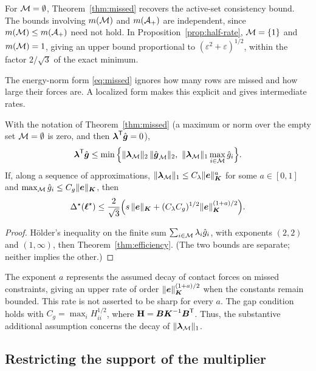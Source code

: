 For $\mathcal{M}=\emptyset$, Theorem~\ref{thm:missed} recovers the active-set consistency bound. The bounds involving $m(\mathcal{M})$ and
$m(\mathcal{A}_{+})$ are independent, since $m(\mathcal{M})\le m(\mathcal{A}_{+})$ need not hold. In Proposition~\ref{prop:half-rate},
$\mathcal{M}=\{1\}$ and $m(\mathcal{M})=1$, giving an upper bound proportional to $(\varepsilon^2+\varepsilon)^{1/2}$, within the factor
$2/\sqrt3$ of the exact minimum.

The energy-norm form \eqref{eq:missed} ignores how many rows are missed and how large their forces are. A localized
form makes this explicit and gives intermediate rates.

\begin{corollary}\label{cor:localized}
With the notation of Theorem~\ref{thm:missed} (a maximum or norm over the empty set $\mathcal{M}=\emptyset$ is zero, and then $\boldsymbol{\lambda}^{\mathsf{T}}\hat{\boldsymbol{g}}=0$),
\begin{equation}\label{eq:localized}
  \vlam\T\gh\le\min\Big\{\norm{\vlam_{\Miss}}_2\,\norm{\gh_{\Miss}}_2,\ \norm{\vlam_{\Miss}}_1\max_{i\in\Miss}\hat g_i\Big\}.
\end{equation}
If, along a sequence of approximations, $\lVert \boldsymbol{\lambda}_{\mathcal{M}} \rVert_1\le C_\lambda\lVert \boldsymbol{e} \rVert_{\boldsymbol{K}}^{a}$ for some $a\in[0,1]$ and
$\max_{\mathcal{M}}\hat g_i\le C_g\lVert \boldsymbol{e} \rVert_{\boldsymbol{K}}$, then
\begin{equation}\label{eq:intermediate-rate}
  \Delta^{\star}(\boldsymbol{\ell}^{\star})\le\frac{2}{\sqrt3}\Big(s\,\lVert \boldsymbol{e} \rVert_{\boldsymbol{K}}+(C_\lambda C_g)^{1/2}\lVert \boldsymbol{e} \rVert_{\boldsymbol{K}}^{(1+a)/2}\Big).
\end{equation}
\end{corollary}
\begin{proof}
Hölder's inequality on the finite sum $\sum_{i\in\mathcal{M}}\lambda_i\hat g_i$, with exponents $(2,2)$ and $(1,\infty)$, then Theorem~\ref{thm:efficiency}. (The two bounds are separate; neither implies the other.)
\end{proof}

The exponent $a$ represents the assumed decay of contact forces on missed constraints, giving an upper rate of order
$\lVert \boldsymbol{e} \rVert_{\boldsymbol{K}}^{(1+a)/2}$ when the constants remain bounded. This rate is not asserted to be sharp for every $a$. The gap condition holds with
$C_g=\max_i H_{ii}^{1/2}$, where $\mathbf H=\boldsymbol{B}\boldsymbol{K}^{-1}\boldsymbol{B}^{\mathsf{T}}$. Thus, the substantive additional assumption concerns the decay of
$\lVert \boldsymbol{\lambda}_{\mathcal{M}} \rVert_1$.

\subsection{Restricting the support of the multiplier}


